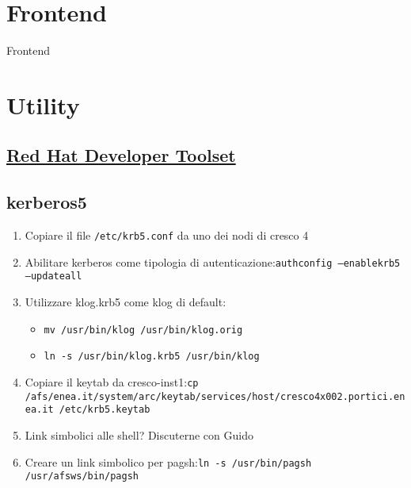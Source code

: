 \documentclass[11pt]{article}
\begin{document}
\section{Frontend}\label{frontend}
Frontend

\section{Utility}
\subsection{\href{https://developers.redhat.com/products/developertoolset/overview/}{Red Hat Developer Toolset}}

\subsection{kerberos5}
\begin{enumerate}
	\item{Copiare il file \texttt{/etc/krb5.conf} da uno dei nodi di cresco 4}
	\item{Abilitare kerberos come tipologia di autenticazione:\newline\texttt{authconfig --enablekrb5 --updateall}}
	\item{Utilizzare klog.krb5 come klog di default:}
		\begin{itemize}
			\item{\texttt{mv /usr/bin/klog /usr/bin/klog.orig}}
			\item{\texttt{ln -s /usr/bin/klog.krb5 /usr/bin/klog}}
		\end{itemize}
	\item{Copiare il keytab da cresco-inst1:\newline\texttt{cp /afs/enea.it/system/arc/keytab/services/host/cresco4x002.portici.enea.it /etc/krb5.keytab}}
	\item{Link simbolici alle shell? Discuterne con Guido}
	\item{Creare un link simbolico per pagsh:\newline\texttt{ln -s /usr/bin/pagsh /usr/afsws/bin/pagsh}}
\end{enumerate}
\end{document}

